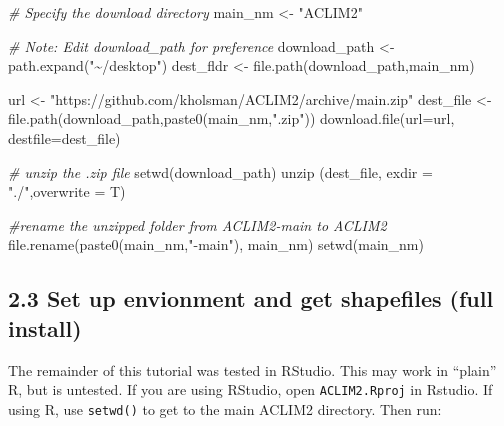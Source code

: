 \documentclass[
]{article}
\newenvironment{Shaded}{\begin{snugshade}}{\end{snugshade}}
\newcommand{\AttributeTok}[1]{\textcolor[rgb]{0.77,0.63,0.00}{#1}}
\newcommand{\CommentTok}[1]{\textcolor[rgb]{0.56,0.35,0.01}{\textit{#1}}}
\newcommand{\FunctionTok}[1]{\textcolor[rgb]{0.00,0.00,0.00}{#1}}
\newcommand{\NormalTok}[1]{#1}
\newcommand{\OtherTok}[1]{\textcolor[rgb]{0.56,0.35,0.01}{#1}}
\newcommand{\StringTok}[1]{\textcolor[rgb]{0.31,0.60,0.02}{#1}}
\begin{document}
\begin{Shaded}
\begin{Highlighting}[]
    \CommentTok{\# Specify the download directory}
\NormalTok{    main\_nm       }\OtherTok{\textless{}{-}} \StringTok{"ACLIM2"}

    \CommentTok{\# Note: Edit download\_path for preference}
\NormalTok{    download\_path }\OtherTok{\textless{}{-}} \FunctionTok{path.expand}\NormalTok{(}\StringTok{"\textasciitilde{}/desktop"}\NormalTok{)}
\NormalTok{    dest\_fldr     }\OtherTok{\textless{}{-}} \FunctionTok{file.path}\NormalTok{(download\_path,main\_nm)}
    
\NormalTok{    url           }\OtherTok{\textless{}{-}} \StringTok{"https://github.com/kholsman/ACLIM2/archive/main.zip"}
\NormalTok{    dest\_file     }\OtherTok{\textless{}{-}} \FunctionTok{file.path}\NormalTok{(download\_path,}\FunctionTok{paste0}\NormalTok{(main\_nm,}\StringTok{".zip"}\NormalTok{))}
    \FunctionTok{download.file}\NormalTok{(}\AttributeTok{url=}\NormalTok{url, }\AttributeTok{destfile=}\NormalTok{dest\_file)}
    
    \CommentTok{\# unzip the .zip file}
    \FunctionTok{setwd}\NormalTok{(download\_path)}
    \FunctionTok{unzip}\NormalTok{ (dest\_file, }\AttributeTok{exdir =} \StringTok{"./"}\NormalTok{,}\AttributeTok{overwrite =}\NormalTok{ T)}
    
    \CommentTok{\#rename the unzipped folder from ACLIM2{-}main to ACLIM2}
    \FunctionTok{file.rename}\NormalTok{(}\FunctionTok{paste0}\NormalTok{(main\_nm,}\StringTok{"{-}main"}\NormalTok{), main\_nm)}
    \FunctionTok{setwd}\NormalTok{(main\_nm)}
\end{Highlighting}
\end{Shaded}

\hypertarget{set-up-envionment-and-get-shapefiles-full-install}{%
\subsection{2.3 Set up envionment and get shapefiles (full
install)}\label{set-up-envionment-and-get-shapefiles-full-install}}

The remainder of this tutorial was tested in RStudio. This may work in
``plain'' R, but is untested. If you are using RStudio, open
\texttt{ACLIM2.Rproj} in Rstudio. If using R, use \texttt{setwd()} to
get to the main ACLIM2 directory. Then run:
\end{document}
